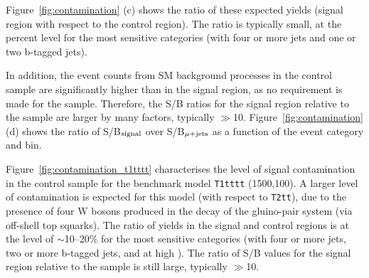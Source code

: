 Figure~\ref{fig:contamination} (c) shows the ratio of these expected
yields (signal region with respect to the \mj control region). The
ratio is typically small, at the percent level for the most sensitive
categories (\ie with four or more jets and one or two b-tagged jets).

In addition, the event counts from SM background processes in the \mj
control sample are significantly higher than in the signal region, as
no \alphat requirement is made for the \mj sample. Therefore, the S/B
ratios for the signal region relative to the \mj sample are larger by
many factors, typically $\gg$10. Figure~\ref{fig:contamination} (d)
shows the ratio of S/B$_{\rm signal}$ over S/B$_{\rm \mu + jets}$ as a
function of the event category and \scalht bin.

Figure~\ref{fig:contamination_t1tttt} characterises the level of
signal contamination in the \mj control sample for the benchmark model
\texttt{T1tttt} (1500,100). A larger level of contamination is
expected for this model (with respect to \texttt{T2tt}), due to the
presence of four W bosons produced in the decay of the gluino-pair
system (via off-shell top squarks). The ratio of yields in the signal
and \mj control regions is at the level of $\sim$10--20\% for the most
sensitive categories (\ie with four or more jets, two or more b-tagged
jets, and at high \scalht). The ratio of S/B values for the signal
region relative to the \mj sample is still large, typically $\gg$10.

